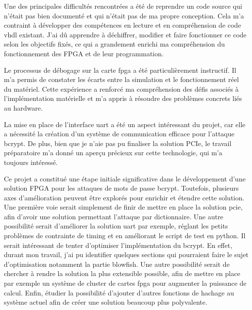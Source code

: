 Une des principales difficultés rencontrées a été de reprendre un code source qui n'était pas bien documenté et qui n'était pas de ma propre conception. 
Cela m'a contraint à développer des compétences en lecture et en compréhension de code \gls{vhdl} existant. 
J'ai dû apprendre à déchiffrer, modifier et faire fonctionner ce code selon les objectifs fixés, ce qui a grandement enrichi ma compréhension du fonctionnement des FPGA et de leur programmation.

Le processus de débogage sur la carte \gls{fpga} a été particulièrement instructif. 
Il m'a permis de constater les écarts entre la simulation et le fonctionnement réel du matériel. 
Cette expérience a renforcé ma compréhension des défis associés à l'implémentation matérielle et m'a appris à résoudre des problèmes concrets liés au hardware.

La mise en place de l'interface \gls{uart} a été un aspect intéressant du projet, car elle a nécessité la création d'un système de communication efficace pour l'attaque bcrypt.
De plus, bien que je n'aie pas pu finaliser la solution PCIe, le travail préparatoire m'a donné un aperçu précieux sur cette technologie, qui m'a toujours intéressé. 


Ce projet a constitué une étape initiale significative dans le développement d’une solution FPGA pour les attaques de mots de passe bcrypt. 
Toutefois, plusieurs axes d'amélioration peuvent être explorés pour enrichir et étendre cette solution.
Une première voie serait simplement de finir de mettre en place la solution \gls{pcie}, afin d'avoir une solution permettant l'attaque par dictionnaire.
Une autre possibilité serait d'améliorer la solution \gls{uart} par exemple, réglant les petits problèmes de contrainte de timing et en améliorant le script de test en python.
Il serait intéressant de tenter d'optimiser l'implémentation du bcrypt. En effet, durant mon travail, j'ai pu identifier quelques sections qui pourraient faire le sujet d'optimisation notamment la partie blowfish.
Une autre possibilité serait de chercher à rendre la solution la plus extensible possible, afin de mettre en place par exemple un système de cluster de cartes \gls{fpga} pour augmenter la puissance de calcul.
Enfin, étudier la possibilité d'ajouter d'autres fonctions de hachage au système actuel afin de créer une solution beaucoup plus polyvalente.
